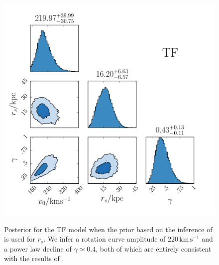 \documentclass[useAMS,twocolumn,usenatbib]{mn2e}
\def\kms{{\,\mathrm{km\,s^{-1}}}}
\begin{document}
\begin{figure}
\includegraphics[width=\columnwidth]{plots/corner_TF}\\
\caption{Posterior for the TF model when the prior based on the inference of \citet{Gi14} is used for $r_s$. 
We infer a rotation curve amplitude of $220\kms$ and a power law decline of $\gamma \simeq 0.4$, both of which are entirely consistent with the results of \citet{Gi14}.}
\label{fig:TF_posterior}
\end{figure}
\end{document}

